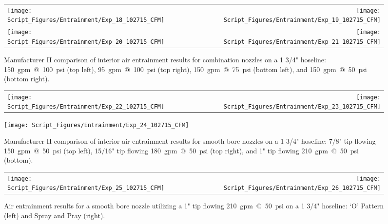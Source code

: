 \documentclass[12pt,oneside]{book}
\begin{document}
\clearpage

\begin{figure}[!ht]
\begin{tabular*}{\textwidth}{lr}
\texttt{[image: Script\_Figures/Entrainment/Exp\_18\_102715\_CFM]} &
\texttt{[image: Script\_Figures/Entrainment/Exp\_19\_102715\_CFM]} \\
\texttt{[image: Script\_Figures/Entrainment/Exp\_20\_102715\_CFM]} &
\texttt{[image: Script\_Figures/Entrainment/Exp\_21\_102715\_CFM]} \\
\end{tabular*}
\caption{Manufacturer II comparison of interior air entrainment results for combination nozzles on a 1 3/4" hoseline: 150~gpm~@~100~psi (top left), 95~gpm~@~100~psi (top right), 150~gpm~@~75~psi (bottom left), and 150~gpm~@~50~psi (bottom right).}
\label{fig:1_5_Interior_Combination_Manufacturer_II}
\end{figure}

\clearpage

\begin{figure}[!ht]
\begin{tabular*}{\textwidth}{lr}
\texttt{[image: Script\_Figures/Entrainment/Exp\_22\_102715\_CFM]} &
\texttt{[image: Script\_Figures/Entrainment/Exp\_23\_102715\_CFM]} \\
\end{tabular*}
\centering
\texttt{[image: Script\_Figures/Entrainment/Exp\_24\_102715\_CFM]} 
\caption{Manufacturer II comparison of interior air entrainment results for smooth bore nozzles on a 1 3/4" hoseline: 7/8" tip flowing 150~gpm~@~50~psi (top left), 15/16" tip flowing 180~gpm~@~50~psi (top right), and 1" tip flowing 210~gpm~@~50~psi (bottom).}
\label{fig:1_5_Interior_Smooth_Bore_Manufacturer_II}
\end{figure}

\clearpage

\begin{figure}[!ht]
\begin{tabular*}{\textwidth}{lr}
\texttt{[image: Script\_Figures/Entrainment/Exp\_25\_102715\_CFM]} &
\texttt{[image: Script\_Figures/Entrainment/Exp\_26\_102715\_CFM]} \\
\end{tabular*}
\caption{Air entrainment results for a smooth bore nozzle utilizing a 1" tip flowing 210~gpm~@~50~psi on a 1 3/4" hoseline: `O' Pattern (left) and Spray and Pray (right).}
\label{fig:Nozzle_Movement}
\end{figure}
\end{document}

